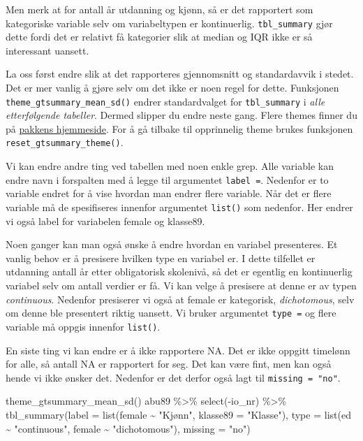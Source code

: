 \documentclass[
  letterpaper,
  DIV=11,
  numbers=noendperiod]{scrreprt}
\newenvironment{Shaded}{\begin{snugshade}}{\end{snugshade}}
\newcommand{\AttributeTok}[1]{\textcolor[rgb]{0.40,0.45,0.13}{#1}}
\newcommand{\FunctionTok}[1]{\textcolor[rgb]{0.28,0.35,0.67}{#1}}
\newcommand{\NormalTok}[1]{\textcolor[rgb]{0.00,0.23,0.31}{#1}}
\newcommand{\SpecialCharTok}[1]{\textcolor[rgb]{0.37,0.37,0.37}{#1}}
\newcommand{\StringTok}[1]{\textcolor[rgb]{0.13,0.47,0.30}{#1}}
\theoremstyle{definition}
\theoremstyle{remark}
\begin{document}
Men merk at for antall år utdanning og kjønn, så er det rapportert som
kategoriske variable selv om variabeltypen er kontinuerlig.
\texttt{tbl\_summary} gjør dette fordi det er relativt få kategorier
slik at median og IQR ikke er så interessant uansett.

La oss først endre slik at det rapporteres gjennomsnitt og standardavvik
i stedet. Det er mer vanlig å gjøre selv om det ikke er noen regel for
dette. Funksjonen \texttt{theme\_gtsummary\_mean\_sd()} endrer
standardvalget for \texttt{tbl\_summary} i \emph{alle etterfølgende
tabeller}. Dermed slipper du endre neste gang. Flere themes finner du på
\href{https://www.danieldsjoberg.com/gtsummary/articles/themes.html}{pakkens
hjemmeside}. For å gå tilbake til opprinnelig theme brukes funksjonen
\texttt{reset\_gtsummary\_theme()}.

Vi kan endre andre ting ved tabellen med noen enkle grep. Alle variable
kan endre navn i forspalten med å legge til argumentet
\texttt{label\ =}. Nedenfor er to variable endret for å vise hvordan man
endrer flere variable. Når det er flere variable må de spesifiseres
innenfor argumentet \texttt{list()} som nedenfor. Her endrer vi også
label for variabelen female og klasse89.

Noen ganger kan man også ønske å endre hvordan en variabel presenteres.
Et vanlig behov er å presisere hvilken type en variabel er. I dette
tilfellet er utdanning antall år etter obligatorisk skolenivå, så det er
egentlig en kontinuerlig variabel selv om antall verdier er få. Vi kan
velge å presisere at denne er av typen \emph{continuous}. Nedenfor
presiserer vi også at female er kategorisk, \emph{dichotomous}, selv om
denne ble presentert riktig uansett. Vi bruker argumentet
\texttt{type\ =} og flere variable må oppgis innenfor \texttt{list()}.

En siste ting vi kan endre er å ikke rapportere NA. Det er ikke oppgitt
timelønn for alle, så antall NA er rapportert for seg. Det kan være
fint, men kan også hende vi ikke ønsker det. Nedenfor er det derfor også
lagt til \texttt{missing\ =\ "no"}.

\begin{Shaded}
\begin{Highlighting}[]
\FunctionTok{theme\_gtsummary\_mean\_sd}\NormalTok{()}
\NormalTok{abu89 }\SpecialCharTok{\%\textgreater{}\%} 
  \FunctionTok{select}\NormalTok{(}\SpecialCharTok{{-}}\NormalTok{io\_nr) }\SpecialCharTok{\%\textgreater{}\%} 
  \FunctionTok{tbl\_summary}\NormalTok{(}\AttributeTok{label =} \FunctionTok{list}\NormalTok{(female }\SpecialCharTok{\textasciitilde{}} \StringTok{"Kjønn"}\NormalTok{, }\AttributeTok{klasse89 =} \StringTok{"Klasse"}\NormalTok{), }
              \AttributeTok{type =} \FunctionTok{list}\NormalTok{(ed }\SpecialCharTok{\textasciitilde{}} \StringTok{"continuous"}\NormalTok{, female }\SpecialCharTok{\textasciitilde{}} \StringTok{"dichotomous"}\NormalTok{), }
              \AttributeTok{missing =} \StringTok{"no"}\NormalTok{)}
\end{Highlighting}
\end{Shaded}
\end{document}
